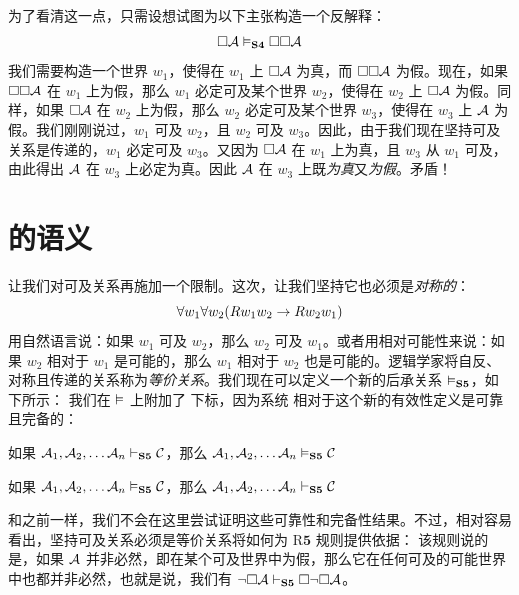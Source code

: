 为了看清这一点，只需设想试图为以下主张构造一个反解释：
\[\Box\mathcal{A} \vDash_{\mathbf{S4}} \Box \Box \mathcal{A}\]
我们需要构造一个世界 $w_1$，使得在 $w_1$ 上 $\Box\mathcal{A}$ 为真，而 $\Box \Box \mathcal{A}$ 为假。现在，如果 $\Box \Box \mathcal{A}$ 在 $w_1$ 上为假，那么 $w_1$ 必定可及某个世界 $w_2$，使得在 $w_2$ 上 $\Box\mathcal{A}$ 为假。同样，如果 $\Box \mathcal{A}$ 在 $w_2$ 上为假，那么 $w_2$ 必定可及某个世界 $w_3$，使得在 $w_3$ 上 $\mathcal{A}$ 为假。我们刚刚说过，$w_1$ 可及 $w_2$，且 $w_2$ 可及 $w_3$。因此，由于我们现在坚持可及关系是传递的，$w_1$ 必定可及 $w_3$。又因为 $\Box\mathcal{A}$ 在 $w_1$ 上为真，且 $w_3$ 从 $w_1$ 可及，由此得出 $\mathcal{A}$ 在 $w_3$ 上必定为真。因此 $\mathcal{A}$ 在 $w_3$ 上既\emph{为真}又\emph{为假}。矛盾！

\section{\mlSfive 的语义}
\label{SemanticsS5}

让我们对可及关系再施加一个限制。这次，让我们坚持它也必须是\emph{对称的}：
\[\forall w_1\forall w_2(Rw_1w_2 \rightarrow Rw_2w_1)\]
用自然语言说：如果 $w_1$ 可及 $w_2$，那么 $w_2$ 可及 $w_1$。或者用相对可能性来说：如果 $w_2$ 相对于 $w_1$ 是可能的，那么 $w_1$ 相对于 $w_2$ 也是可能的。逻辑学家将自反、对称且传递的关系称为\emph{等价关系}。我们现在可以定义一个新的后承关系 $\vDash_{\mathbf{S5}} $，如下所示：
我们在 $\vDash$ 上附加了 \mlSfive{} 下标，因为系统 \mlSfive{} 相对于这个新的有效性定义是可靠且完备的：


\begin{compactlist}
	\item 如果 $\mathcal{A}_1,\mathcal{A}_2, \dots \mathcal{A}_n\vdash_{\mathbf{S5}} \mathcal{C}$，那么 $\mathcal{A}_1,\mathcal{A}_2, \dots \mathcal{A}_n\vDash_{\mathbf{S5}} \mathcal{C}$
	\item 如果 $\mathcal{A}_1,\mathcal{A}_2, \dots \mathcal{A}_n\vDash_{\mathbf{S5}} \mathcal{C}$，那么 $\mathcal{A}_1,\mathcal{A}_2, \dots \mathcal{A}_n\vdash_{\mathbf{S5}} \mathcal{C}$
\end{compactlist}


和之前一样，我们不会在这里尝试证明这些可靠性和完备性结果。不过，相对容易看出，坚持可及关系必须是等价关系将如何为 R$\mathbf{5}$ 规则提供依据：
该规则说的是，如果 $\mathcal{A}$ 并非必然，即在某个可及世界中为假，那么它在任何可及的可能世界中也都并非必然，也就是说，我们有 $\neg\Box \mathcal{A} \vdash_{\mathbf{S5}}  \Box\neg\Box \mathcal{A}$。

